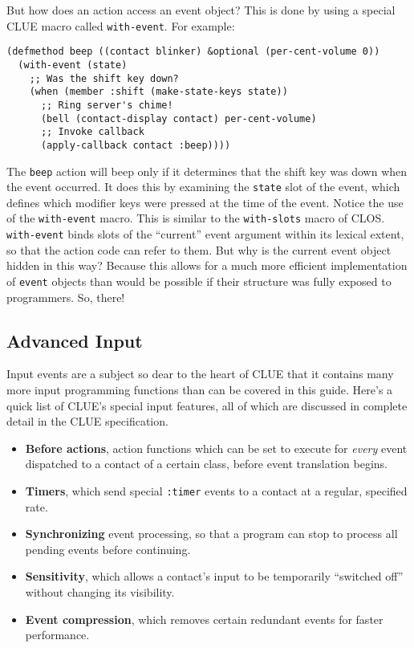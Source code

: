 But how does an action access an event object? This is done by using a special
CLUE macro called {\tt with-event}. For example:

\begin{verbatim}
(defmethod beep ((contact blinker) &optional (per-cent-volume 0))
  (with-event (state)
    ;; Was the shift key down?
    (when (member :shift (make-state-keys state))
      ;; Ring server's chime!
      (bell (contact-display contact) per-cent-volume)  
      ;; Invoke callback
      (apply-callback contact :beep))))
\end{verbatim}

The {\tt beep} action will beep only if it determines that the shift key was
down when the event occurred.  It does this by examining the {\tt state} slot of
the event, which defines which modifier keys were pressed at the time of the
event.  Notice the use of the {\tt with-event} macro. This is
similar to the {\tt with-slots} macro of CLOS.  {\tt with-event}
binds slots of the ``current'' event argument within its lexical extent, so that
the action code can refer to them.  But why is the current event object hidden
in this way?  Because this allows for a much more efficient implementation of
{\tt event} objects than would be possible if their structure was fully exposed
to programmers.  So, there!

\subsection{Advanced Input}
Input events are a subject so dear to the heart of CLUE that it
contains many more input programming functions than can be
covered in this guide. Here's a quick list of CLUE's special input
features, all of which are discussed in complete detail in the CLUE
specification.
\begin{itemize}
\item {\bf Before actions},
action functions which can be set to execute for {\em every} event
dispatched to a contact of a certain class, before event translation begins. 

\item {\bf Timers},
which send special {\tt :timer} events to a contact at a regular,
specified rate.

\item {\bf Synchronizing}
event processing, so that a program can stop to process all pending
events before continuing.

\item {\bf
Sensitivity}, which allows a contact's input to be temporarily ``switched
off'' without changing its visibility.

\item {\bf Event compression},
which removes certain redundant events for faster performance.
\end{itemize}

